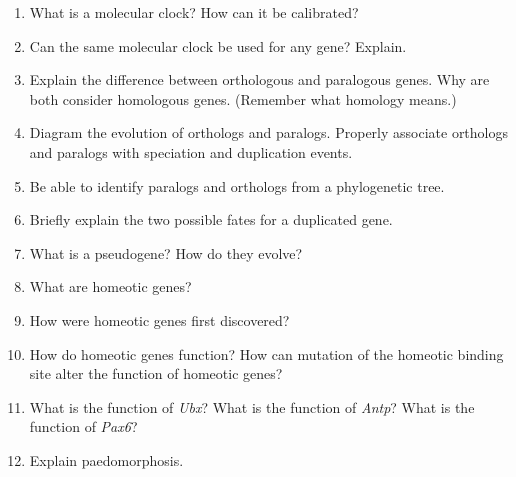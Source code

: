 \documentclass[letterpaper]{tufte-handout}
\begin{document}
\begin{enumerate}

	\item What is a molecular clock? How can it be calibrated?

	\item Can the same molecular clock be used for any gene? Explain. 

	\item Explain the difference between orthologous and paralogous genes. Why are both consider homologous genes. (Remember what homology means.)

	\item Diagram the evolution of orthologs and paralogs.  Properly associate orthologs and paralogs with speciation and duplication events.

	\item Be able to identify paralogs and orthologs from a phylogenetic tree.
 
	\item Briefly explain the two possible fates for a duplicated gene.

	\item What is a pseudogene? How do they evolve?

	\item What are homeotic genes? 	
	
	\item How were homeotic genes first discovered?
	
	\item How do homeotic genes function? How can mutation of the homeotic binding site alter the function of homeotic genes? 
	
	\item What is the function of \textit{Ubx}? What is the function of \textit{Antp}? What is the function of \textit{Pax6}?
	
	\item Explain paedomorphosis.


\end{enumerate}
\end{document}
